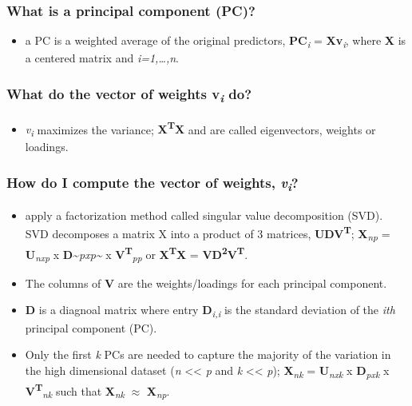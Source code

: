 \documentclass[]{book}
\providecommand{\tightlist}{%
  \setlength{\itemsep}{0pt}\setlength{\parskip}{0pt}}
\begin{document}
\subsubsection{What is a principal component
(PC)?}\label{what-is-a-principal-component-pc}

\begin{itemize}
\tightlist
\item
  a PC is a weighted average of the original predictors,
  \textbf{PC}\textsubscript{\emph{i}} =
  \textbf{Xv}\textsubscript{\emph{i}}, where \textbf{X} is a centered
  matrix and \emph{i=1,\ldots{},n}.
\end{itemize}

\subsubsection{\texorpdfstring{What do the vector of weights
\textbf{v}\textsubscript{\emph{i}}
do?}{What do the vector of weights vi do?}}\label{what-do-the-vector-of-weights-vi-do}

\begin{itemize}
\tightlist
\item
  \emph{v\textsubscript{i}} maximizes the variance;
  \textbf{X\textsuperscript{T}X} and are called eigenvectors, weights or
  loadings.
\end{itemize}

\subsubsection{\texorpdfstring{How do I compute the vector of weights,
\emph{v\textsubscript{i}}?}{How do I compute the vector of weights, vi?}}\label{how-do-i-compute-the-vector-of-weights-vi}

\begin{itemize}
\tightlist
\item
  apply a factorization method called singular value decomposition
  (SVD). SVD decomposes a matrix X into a product of 3 matrices,
  \textbf{UDV\textsuperscript{T}}; \textbf{X}\textsubscript{\emph{np}} =
  \textbf{U}\textsubscript{\emph{nxp}} x
  \textbf{D}\textasciitilde{}\emph{pxp\textasciitilde{}} x
  \textbf{V\textsuperscript{T}}\textsubscript{\emph{pp}} or
  \textbf{X\textsuperscript{T}X} =
  \textbf{VD\textsuperscript{2}V\textsuperscript{T}}.
\item
  The columns of \textbf{V} are the weights/loadings for each principal
  component.
\item
  \textbf{D} is a diagnoal matrix where entry
  \textbf{D}\textsubscript{\emph{i,i}} is the standard deviation of the
  \emph{ith} principal component (PC).
\item
  Only the first \emph{k} PCs are needed to capture the majority of the
  variation in the high dimensional dataset (\emph{n}
  \textless{}\textless{} \emph{p} and \emph{k} \textless{}\textless{}
  \emph{p}); \textbf{X}\textsubscript{\emph{nk}} =
  \textbf{U}\textsubscript{\emph{nxk}} x
  \textbf{D}\textsubscript{\emph{pxk}} x
  \textbf{V\textsuperscript{T}}\textsubscript{\emph{nk}} such that
  \textbf{X}\textsubscript{\emph{nk}} \(\approx\)
  \textbf{X}\textsubscript{\emph{np}}.
\end{itemize}
\end{document}
